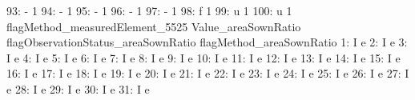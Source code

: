 \documentclass[nojss]{jss}
\begin{document}
\begin{Schunk}
\begin{Soutput}
 93:                               -                   1
 94:                               -                   1
 95:                               -                   1
 96:                               -                   1
 97:                               -                   1
 98:                               f                   1
 99:                               u                   1
100:                               u                   1
     flagMethod_measuredElement_5525 Value_areaSownRatio
     flagObservationStatus_areaSownRatio flagMethod_areaSownRatio
  1:                                   I                        e
  2:                                   I                        e
  3:                                   I                        e
  4:                                   I                        e
  5:                                   I                        e
  6:                                   I                        e
  7:                                   I                        e
  8:                                   I                        e
  9:                                   I                        e
 10:                                   I                        e
 11:                                   I                        e
 12:                                   I                        e
 13:                                   I                        e
 14:                                   I                        e
 15:                                   I                        e
 16:                                   I                        e
 17:                                   I                        e
 18:                                   I                        e
 19:                                   I                        e
 20:                                   I                        e
 21:                                   I                        e
 22:                                   I                        e
 23:                                   I                        e
 24:                                   I                        e
 25:                                   I                        e
 26:                                   I                        e
 27:                                   I                        e
 28:                                   I                        e
 29:                                   I                        e
 30:                                   I                        e
 31:                                   I                        e

\end{Soutput}
\end{Schunk}
\end{document}
